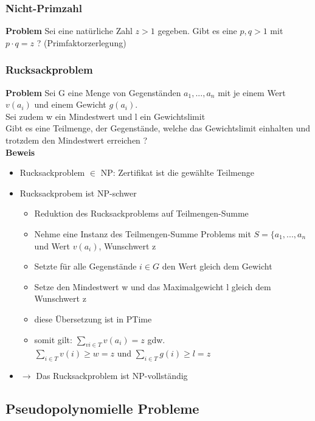 \documentclass[12pt,a4paper]{article}
\begin{document}
\subsubsection{Nicht-Primzahl}
\textbf{Problem}
Sei eine natürliche Zahl $z>1$ gegeben. Gibt es eine $p,q>1$ mit $p\cdot q = z$ ? (Primfaktorzerlegung)

\subsubsection{Rucksackproblem}
\textbf{Problem}
Sei G eine Menge von Gegenständen $a_1,...,a_n$ mit je einem Wert $v(a_i)$ und einem Gewicht $g(a_i)$.\\
Sei zudem w ein Mindestwert und l ein Gewichtslimit\\
Gibt es eine Teilmenge, der Gegenstände, welche das Gewichtslimit einhalten und trotzdem den Mindestwert erreichen ?\\

\textbf{Beweis}
\begin{itemize}
\item Rucksackproblem $\in$ NP: Zertifikat ist die gewählte Teilmenge
\item Rucksackprobem ist NP-schwer
\begin{itemize}
\item Reduktion des Rucksackproblems auf Teilmengen-Summe
\item Nehme eine Instanz des Teilmengen-Summe Problems mit $S = \{a_1,...,a_n$ und Wert $v(a_i)$, Wunschwert z
\item Setzte für alle Gegenstände $i\in G$ den Wert gleich dem Gewicht
\item Setze den Mindestwert w und das Maximalgewicht l gleich dem Wunschwert z
\item diese Übersetzung ist in PTime
\item somit gilt: $\sum_{vi\in T} v(a_i) = z$ gdw.\\
$\sum_{i\in T} v(i) \geq w = z$ und $\sum_{i\in T} g(i) \geq l = z$
\end{itemize}
\item $\rightarrow$ Das Rucksackproblem ist NP-vollständig
\end{itemize}

\subsection{Pseudopolynomielle Probleme}
\end{document}
